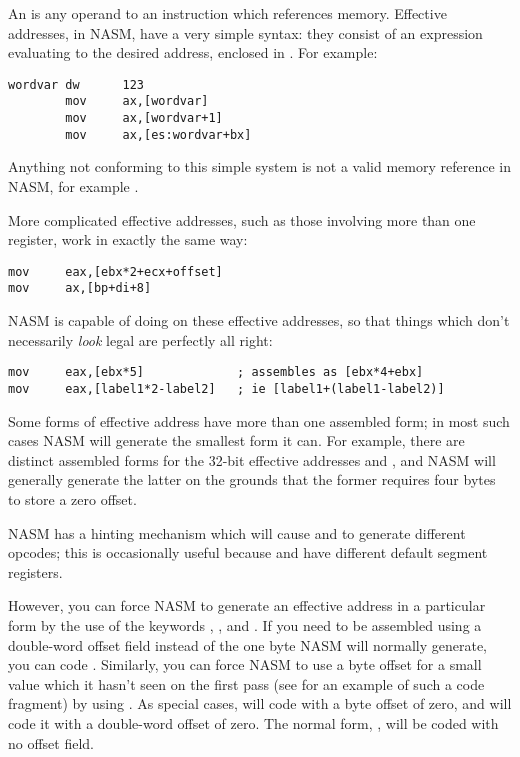
An  is any operand to an instruction which
references memory. Effective addresses, in NASM,
have a very simple syntax: they consist of an expression evaluating
to the desired address, enclosed in . For
example:

\begin{lstlisting}
wordvar dw      123
        mov     ax,[wordvar]
        mov     ax,[wordvar+1]
        mov     ax,[es:wordvar+bx]
\end{lstlisting}

Anything not conforming to this simple system is not a valid memory
reference in NASM, for example .

More complicated effective addresses, such as those involving more
than one register, work in exactly the same way:

\begin{lstlisting}
mov     eax,[ebx*2+ecx+offset]
mov     ax,[bp+di+8]
\end{lstlisting}

NASM is capable of doing  on these effective addresses,
so that things which don't necessarily \emph{look} legal are perfectly
all right:

\begin{lstlisting}
mov     eax,[ebx*5]             ; assembles as [ebx*4+ebx]
mov     eax,[label1*2-label2]   ; ie [label1+(label1-label2)]
\end{lstlisting}

Some forms of effective address have more than one assembled form;
in most such cases NASM will generate the smallest form it can. For
example, there are distinct assembled forms for the 32-bit effective
addresses \code{[eax*2+0]} and , and NASM will
generally generate the latter on the grounds that the former requires
four bytes to store a zero offset.

NASM has a hinting mechanism which will cause  and
 to generate different opcodes; this is occasionally
useful because  and  have different
default segment registers.

However, you can force NASM to generate an effective address in a
particular form by the use of the keywords , ,
 and . If you need \code{[eax+3]} to be
assembled using a double-word offset field instead of the one byte NASM
will normally generate, you can code . Similarly, you
can force NASM to use a byte offset for a small value which it hasn't seen
on the first pass (see  for an example of such a code
fragment) by using . As special cases, 
will code \code{[eax+0]} with a byte offset of zero, and 
will code it with a double-word offset of zero. The normal form, \code{[eax]},
will be coded with no offset field.

